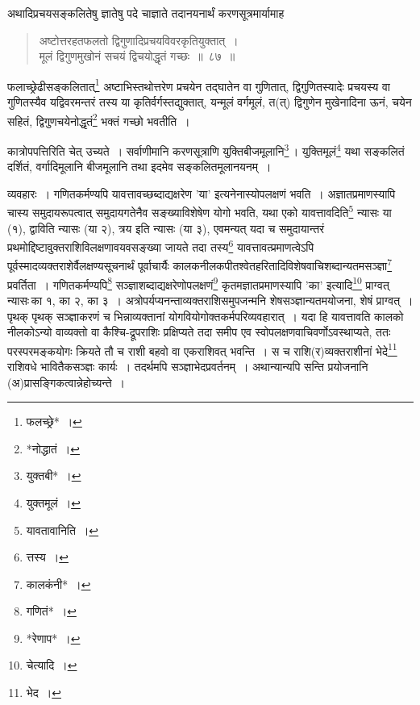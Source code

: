 \documentclass[10pt, openany]{book}
\begin{document}
{{{{{{{अथादिप्रचयसङ्कलितेषु ज्ञातेषु पदे चाज्ञाते तदानयनार्थं
करणसूत्रमार्यामाह\textemdash}

 \label{87}
\begin{quote}
    
{\bs अष्टोत्तरहतफलतो द्विगुणादिप्रचयविवरकृतियुक्तात्~।\\
 मूलं द्विगुणमुखोनं सचयं द्विचयोद्धृतं गच्छः~॥~८७~॥}\end{quote}

{फलाच्छ्रेढीसङ्कलितात्\renewcommand{\thefootnote}{११}\footnote{फलच्छ्रे*~।}  अष्टाभिस्तथोत्तरेण प्रचयेन तद्घातेन वा
गुणितात्, द्विगुणितस्यादेः प्रचयस्य वा गुणितस्यैव यद्विवरमन्तरं तस्य या
कृतिर्वर्गस्तद्युक्तात्, यन्मूलं वर्गमूलं,}
{त(त्) द्विगुणेन मुखेनादिना ऊनं, चयेन सहितं, द्विगुणचयेनोद्धृतं\renewcommand{\thefootnote}{१२}\footnote{*नोद्धातं~।} 
भक्तं गच्छो भवतीति~।}
\vspace{2mm}

{कात्रोपपत्तिरिति चेत् उच्यते~। सर्वाणीमानि करणसूत्राणि
युक्तिबीजमूलानि\renewcommand{\thefootnote}{१३}\footnote{युक्तबी*~।}\,।}
{युक्तिमूलं\renewcommand{\thefootnote}{१४}\footnote{युक्तमूलं~।}  यथा सङ्कलितं दर्शितं, वर्गादिमूलानि बीजमूलानि तथा
इदमेव सङ्कलितमूलानयनम्~।}

\newpage

{व्यवहारः~। गणितकर्मण्यपि यावत्तावच्छब्दाद्यक्षरेण 'या'
इत्यनेनास्योपलक्षणं भवति~। अज्ञातप्रमाणस्यापि चास्य समुदायरूपत्वात् समुदायगतेनैव सङ्ख्याविशेषेण योगो
भवति, यथा एको}
{यावत्तावदिति\renewcommand{\thefootnote}{१}\footnote{यावतावानिति~।} न्यासः या (१), द्वाविति न्यासः (या २), त्रय इति
न्यासः (या ३), एवमन्यत्}
{यदा च समुदायान्तरं प्रथमोद्दिष्टावुक्तराशिविलक्षणावयवसङ्ख्या जायते तदा
तस्य\renewcommand{\thefootnote}{२}\footnote{त्तस्य~।} यावत्तावत्प्रमाणत्वेऽपि पूर्वस्मादव्यक्तराशेर्वैलक्षण्यसूचनार्थं पूर्वाचार्यैः
कालकनीलकपीतश्वेतहरितादिविशेषवाचिशब्दान्यतमसञ्ज्ञा\renewcommand{\thefootnote}{३}\footnote{कालकंनी*~।} प्रवर्तिता~। गणितकर्मण्यपि\renewcommand{\thefootnote}{४}\footnote{गणितं*~।}
सञ्ज्ञाशब्दाद्यक्षरेणोपलक्षणं\renewcommand{\thefootnote}{५}\footnote{*रेणाप*~।} कृतमज्ञातप्रमाणस्यापि 'का' इत्यादि\renewcommand{\thefootnote}{६}\footnote{चेत्यादि~।} प्राग्वत् न्यासः\textendash \,का १, का २, का ३~। 
अत्रोपर्यप्यनन्ताव्यक्तराशिसमुपजन्मनि शेषसञ्ज्ञान्यतमयोजना, शेषं प्राग्वत्~। पृथक् पृथक् सञ्ज्ञाकरणं 
च भिन्नाव्यक्तानां}
{योगवियोगोक्तकर्मपरिव्यवहारात्~। यदा हि यावत्तावति कालको नीलकोऽन्यो
वाव्यक्तो वा कैश्चि-द्रूपराशिः प्रक्षिप्यते तदा समीप एव
स्वोपलक्षणवाचिवर्णोऽवस्थाप्यते, ततः}
{परस्परमङ्कयोगः क्रियते तौ च राशी बहवो वा एकराशिवत् भवन्ति~। स च
राशि(र)व्यक्तराशीनां भेदे\renewcommand{\thefootnote}{७}\footnote{भेद~।} राशिवधे भावितैकसञ्ज्ञः कार्यः~। तदर्थमपि
सञ्ज्ञाभेदप्रवर्तनम्~। अथान्यान्यपि सन्ति}
{प्रयोजनानि (अ)प्रासङ्गिकत्वान्नेहोच्यन्ते~।}
\vspace{3mm}

}}}}}}
\end{document}
